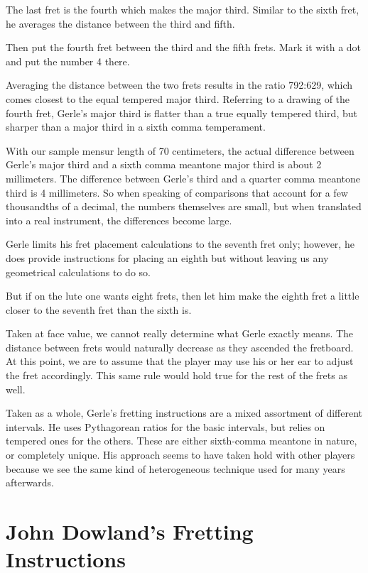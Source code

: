 The last fret is the fourth which makes the major third.  Similar to the sixth fret, he
averages the distance between the third and fifth.
\begin{blocks}
Then put the fourth fret between the third and the fifth frets.  Mark it with a
dot and put the number 4 there.
\end{blocks}
Averaging the distance between the two frets results in the ratio 792:629, which comes
closest to the equal tempered major third. Referring to a drawing of the fourth fret,
Gerle's major third is flatter than a true equally tempered third, but sharper than a
major third in a sixth comma temperament.

With our sample mensur length of 70 centimeters, the actual difference
between Gerle's major third and a sixth comma meantone major third is about 2
millimeters.  The difference between Gerle's third and a quarter comma meantone third
is 4 millimeters. So when speaking of comparisons that account for a few thousandths of
a decimal, the numbers themselves are small, but when translated into a real
instrument, the differences become large.

Gerle limits his fret placement calculations to the seventh fret only; however,
he does provide instructions for placing an eighth but without leaving us any
geometrical calculations to do so.
\begin{blocks}
But if on the lute one wants eight frets, then let him make the eighth fret a
little closer to the seventh fret than the sixth is.
\end{blocks}
Taken at face value, we cannot really determine what Gerle exactly means. The
distance between frets would naturally decrease as they ascended the fretboard.
At this point, we are to assume that the player may use his or her ear to adjust
the fret accordingly.  This same rule would hold true for the rest of the frets
as well.

Taken as a whole, Gerle's fretting instructions are a mixed assortment of different
intervals.  He uses Pythagorean ratios for the basic intervals, but relies on tempered
ones for the others.  These are either sixth-comma meantone in nature, or completely
unique.  His approach seems to have taken hold with other players because we see the
same kind of heterogeneous technique used for many years afterwards.

%
%
\section{John Dowland's Fretting Instructions}

